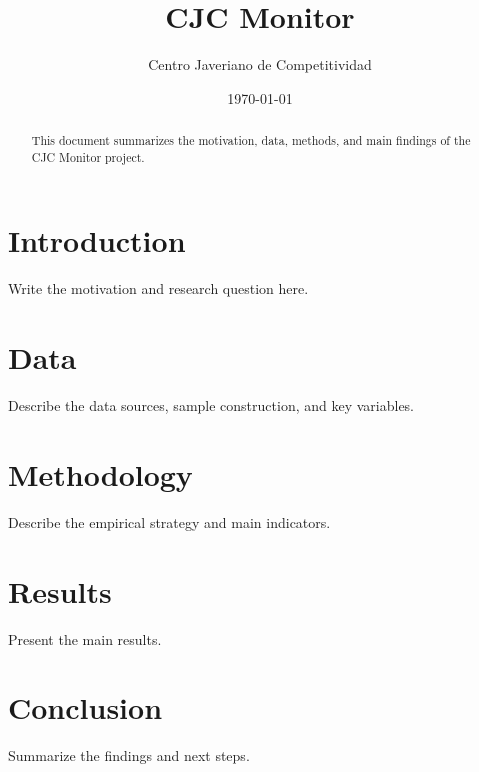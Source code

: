 \documentclass[12pt]{article}
\title{CJC Monitor}
\author{Centro Javeriano de Competitividad}
\date{\today}
\begin{document}
\maketitle

\begin{abstract}
This document summarizes the motivation, data, methods, and main findings of the CJC Monitor project.
\end{abstract}

\section{Introduction}

Write the motivation and research question here.

\section{Data}

Describe the data sources, sample construction, and key variables.

\section{Methodology}

Describe the empirical strategy and main indicators.

\section{Results}

Present the main results.

\section{Conclusion}

Summarize the findings and next steps.



\end{document}
